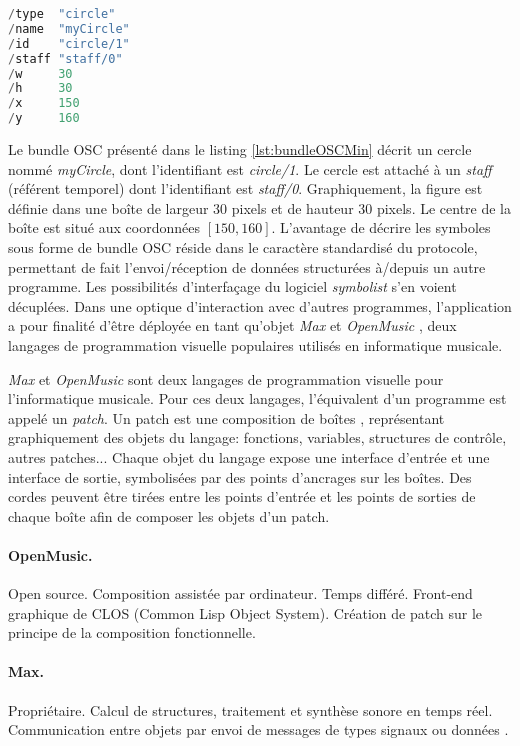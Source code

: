 \begin{lstlisting}[language=java, 
				   caption={Messages OSC \'{e}l\'{e}mentaires pour les symboles d'une partition \textit{symbolist}}, 
				   label={lst:bundleOSCMin}, 
				   captionpos={b}, 
				   numbers=none]
/type  "circle"
/name  "myCircle"
/id    "circle/1"
/staff "staff/0"
/w     30
/h     30
/x     150
/y     160 
\end{lstlisting}

Le bundle OSC présenté dans le listing \ref{lst:bundleOSCMin} décrit un cercle nommé \textit{myCircle}, dont l'identifiant est \textit{circle/1}. Le cercle est attaché à un \textit{staff} (référent temporel) dont l'identifiant est \textit{staff/0}. Graphiquement, la figure est définie dans une boîte de largeur 30 pixels et de hauteur 30 pixels. Le centre de la boîte est situé aux coordonnées $[150, 160]$.
L'avantage de décrire les symboles sous forme de bundle OSC réside dans le caractère standardisé du protocole, permettant de fait l'envoi/réception de données structurées à/depuis un autre programme. Les possibilités d'interfaçage du logiciel \textit{symbolist} s'en voient décuplées.
Dans une optique d'interaction avec d'autres programmes, l'application a pour finalité d'être déployée en tant qu'objet \textit{Max} \cite{puckette1991} et \textit{OpenMusic} \cite{agon1998}, deux langages de programmation visuelle populaires utilisés en informatique musicale.

\begin{mdframed}[backgroundcolor=blue!20]

\textit{Max} et \textit{OpenMusic} sont deux langages de programmation visuelle pour l'informatique musicale. Pour ces deux langages, l'équivalent d'un programme est appelé un \textit{patch}. Un patch est une composition de \og boîtes \fg, représentant graphiquement des objets du langage: fonctions, variables, structures de contrôle, autres patches... Chaque objet du langage expose une interface d'entrée et une interface de sortie, symbolisées par des points d'ancrages sur les boîtes. Des cordes peuvent être tirées entre les points d'entrée et les points de sorties de chaque boîte afin de composer les objets d'un patch.
\paragraph{OpenMusic.} Open source. Composition assistée par ordinateur. Temps différé. Front-end graphique de CLOS (Common Lisp Object System). Création de patch sur le principe de la composition fonctionnelle.

\paragraph{Max.} Propriétaire. Calcul de structures, traitement et synthèse sonore en temps réel. Communication entre objets par envoi de messages de types \og signaux \fg ou \og données \fg.       
\end{mdframed}